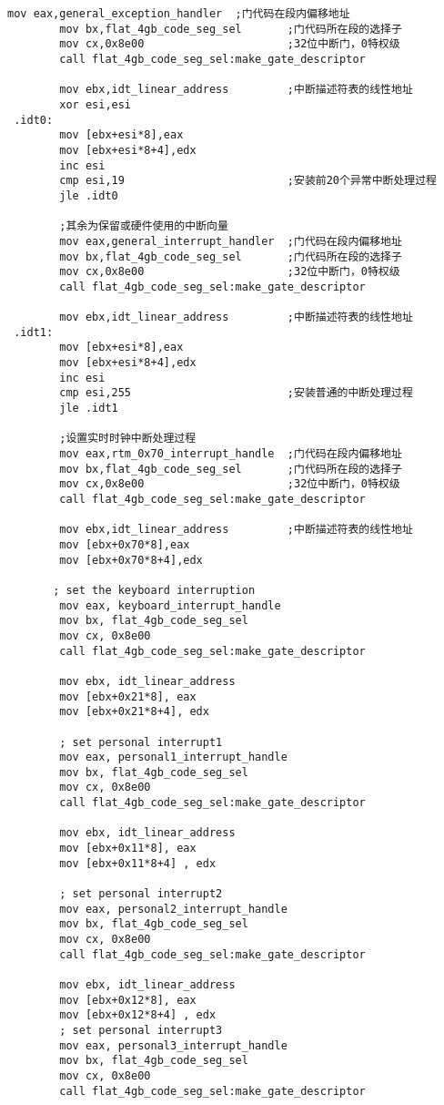\documentclass[a4paper,11pt,UTF8]{ctexart}
\begin{document}
	\begin{lstlisting}[caption={安装 IDT},tabsize=4,basicstyle=\footnotesize,captionpos=b]
		mov eax,general_exception_handler  ;门代码在段内偏移地址
		mov bx,flat_4gb_code_seg_sel       ;门代码所在段的选择子
		mov cx,0x8e00                      ;32位中断门，0特权级
		call flat_4gb_code_seg_sel:make_gate_descriptor

		mov ebx,idt_linear_address         ;中断描述符表的线性地址
		xor esi,esi
 .idt0:
		mov [ebx+esi*8],eax
		mov [ebx+esi*8+4],edx
		inc esi
		cmp esi,19                         ;安装前20个异常中断处理过程
		jle .idt0

		;其余为保留或硬件使用的中断向量
		mov eax,general_interrupt_handler  ;门代码在段内偏移地址
		mov bx,flat_4gb_code_seg_sel       ;门代码所在段的选择子
		mov cx,0x8e00                      ;32位中断门，0特权级
		call flat_4gb_code_seg_sel:make_gate_descriptor

		mov ebx,idt_linear_address         ;中断描述符表的线性地址
 .idt1:
		mov [ebx+esi*8],eax
		mov [ebx+esi*8+4],edx
		inc esi
		cmp esi,255                        ;安装普通的中断处理过程
		jle .idt1

		;设置实时时钟中断处理过程
		mov eax,rtm_0x70_interrupt_handle  ;门代码在段内偏移地址
		mov bx,flat_4gb_code_seg_sel       ;门代码所在段的选择子
		mov cx,0x8e00                      ;32位中断门，0特权级
		call flat_4gb_code_seg_sel:make_gate_descriptor

		mov ebx,idt_linear_address         ;中断描述符表的线性地址
		mov [ebx+0x70*8],eax
		mov [ebx+0x70*8+4],edx

	   ; set the keyboard interruption
		mov eax, keyboard_interrupt_handle
		mov bx, flat_4gb_code_seg_sel
		mov cx, 0x8e00
		call flat_4gb_code_seg_sel:make_gate_descriptor

		mov ebx, idt_linear_address
		mov [ebx+0x21*8], eax
		mov [ebx+0x21*8+4], edx

		; set personal interrupt1
		mov eax, personal1_interrupt_handle
		mov bx, flat_4gb_code_seg_sel
		mov cx, 0x8e00
		call flat_4gb_code_seg_sel:make_gate_descriptor

		mov ebx, idt_linear_address
		mov [ebx+0x11*8], eax
		mov [ebx+0x11*8+4] , edx

		; set personal interrupt2
		mov eax, personal2_interrupt_handle
		mov bx, flat_4gb_code_seg_sel
		mov cx, 0x8e00
		call flat_4gb_code_seg_sel:make_gate_descriptor

		mov ebx, idt_linear_address
		mov [ebx+0x12*8], eax
		mov [ebx+0x12*8+4] , edx
		; set personal interrupt3
		mov eax, personal3_interrupt_handle
		mov bx, flat_4gb_code_seg_sel
		mov cx, 0x8e00
		call flat_4gb_code_seg_sel:make_gate_descriptor


\end{lstlisting}
\end{document}
